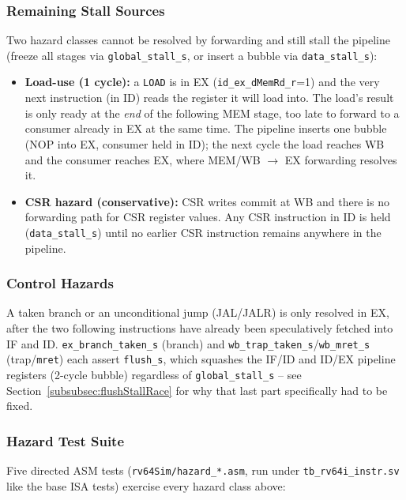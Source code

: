 \subsubsection{Remaining Stall Sources}

Two hazard classes cannot be resolved by forwarding and still stall the
pipeline (freeze all stages via \texttt{global\_stall\_s}, or insert a
bubble via \texttt{data\_stall\_s}):

\begin{itemize}
  \item \textbf{Load-use (1 cycle):} a \texttt{LOAD} is in EX
    (\texttt{id\_ex\_dMemRd\_r}=1) and the very next instruction (in ID)
    reads the register it will load into. The load's result is only ready
    at the \emph{end} of the following MEM stage, too late to forward to a
    consumer already in EX at the same time. The pipeline inserts one
    bubble (NOP into EX, consumer held in ID); the next cycle the load
    reaches WB and the consumer reaches EX, where MEM/WB $\rightarrow$ EX
    forwarding resolves it.
  \item \textbf{CSR hazard (conservative):} CSR writes commit at WB and
    there is no forwarding path for CSR register values. Any CSR
    instruction in ID is held (\texttt{data\_stall\_s}) until no earlier
    CSR instruction remains anywhere in the pipeline.
\end{itemize}

\subsubsection{Control Hazards}

A taken branch or an unconditional jump (JAL/JALR) is only resolved in EX,
after the two following instructions have already been speculatively
fetched into IF and ID. \texttt{ex\_branch\_taken\_s} (branch) and
\texttt{wb\_trap\_taken\_s}/\texttt{wb\_mret\_s} (trap/\texttt{mret})
each assert \texttt{flush\_s}, which squashes the IF/ID and ID/EX pipeline
registers (2-cycle bubble) regardless of \texttt{global\_stall\_s} -- see
Section~\ref{subsubsec:flushStallRace} for why that last part specifically
had to be fixed.

\subsubsection{Hazard Test Suite}
\label{subsubsec:hazardTestSuite}

Five directed ASM tests (\texttt{rv64Sim/hazard\_*.asm}, run under
\texttt{tb\_rv64i\_instr.sv} like the base ISA tests) exercise every
hazard class above:

